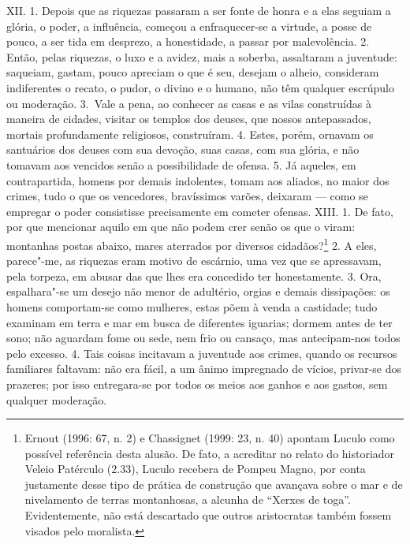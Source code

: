 XII. 1. Depois que as riquezas passaram a ser fonte de honra e a elas seguiam a
glória, o poder, a influência, começou a enfraquecer-se a virtude, a posse de
pouco, a ser tida em desprezo, a honestidade, a passar por malevolência. 2.
Então, pelas riquezas, o luxo e a avidez, mais a soberba, assaltaram a
juventude: saqueiam, gastam, pouco apreciam o que é seu, desejam o alheio,
consideram indiferentes o recato, o pudor, o divino e o humano, não têm
qualquer escrúpulo ou moderação. 3.~Vale a pena, ao conhecer as casas e as
vilas construídas à maneira de cidades, visitar os templos dos deuses, que
nossos antepassados, mortais profundamente religiosos, construíram. 4. Estes,
porém, ornavam os santuários dos deuses com sua devoção, suas casas, com sua
glória, e não tomavam aos vencidos senão a possibilidade de ofensa. 5. Já
aqueles, em contrapartida, homens por demais indolentes, tomam aos aliados, no
maior dos crimes, tudo o que os vencedores, bravíssimos varões, deixaram ---
como se empregar o poder consistisse precisamente em cometer ofensas.  XIII. 1.
De fato, por que mencionar aquilo em que não podem crer senão os que o viram:
montanhas postas abaixo, mares aterrados por diversos cidadãos?\footnote{Ernout
(1996: 67, n. 2) e Chassignet (1999: 23, n. 40) apontam Luculo como
possível referência desta alusão. De fato, a acreditar no relato do historiador
Veleio Patérculo (2.33), Luculo recebera de Pompeu Magno, por conta justamente
desse tipo de prática de construção que avançava sobre o mar e de nivelamento
de terras montanhosas, a alcunha de ``Xerxes de toga''. Evidentemente, não está
descartado que outros aristocratas também fossem visados pelo moralista.} 2. A
eles, parece"-me, as riquezas eram motivo de escárnio, uma vez que se
apressavam, pela torpeza, em abusar das que lhes era concedido ter
honestamente. 3. Ora, espalhara"-se um desejo não menor de adultério, orgias e
demais dissipações: os homens comportam-se como mulheres, estas põem à venda a
castidade; tudo examinam em terra e mar em busca de diferentes iguarias; dormem
antes de ter sono; não aguardam fome ou sede, nem frio ou cansaço, mas
antecipam-nos todos pelo excesso. 4. Tais coisas incitavam a juventude aos
crimes, quando os recursos familiares faltavam: não era fácil, a um ânimo
impregnado de vícios, privar-se dos prazeres; por isso entregara-se por todos
os meios aos ganhos e aos gastos, sem qualquer moderação.

